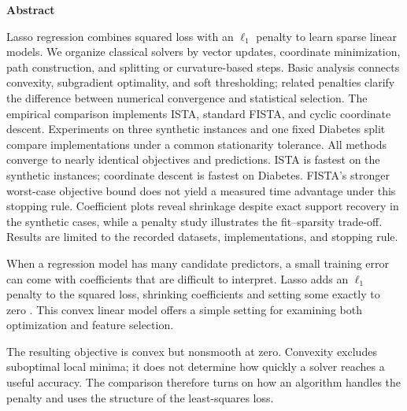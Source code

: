 \documentclass[10pt,letterpaper]{article}
\makeatletter
\renewcommand{\section}{\@startsection{section}{1}{\z@}{-2ex plus-.5ex minus-.2ex}{1.2ex plus.2ex}{\fontsize{12}{14}\selectfont\bfseries\raggedright}}
\makeatother
\begin{document}
\begingroup
\renewcommand{\thefootnote}{\ensuremath{*}}
\endgroup
\vspace{4pt}
\begin{center}\fontsize{12}{14}\selectfont\bfseries Abstract\end{center}
\begin{list}{}{\setlength{\leftmargin}{.5in}\setlength{\rightmargin}{.5in}}
\item[]
Lasso regression combines squared loss with an $\ell_1$ penalty to learn sparse linear models. We organize classical solvers by vector updates, coordinate minimization, path construction, and splitting or curvature-based steps. Basic analysis connects convexity, subgradient optimality, and soft thresholding; related penalties clarify the difference between numerical convergence and statistical selection. The empirical comparison implements ISTA, standard FISTA, and cyclic coordinate descent. Experiments on three synthetic instances and one fixed Diabetes split compare implementations under a common stationarity tolerance. All methods converge to nearly identical objectives and predictions. ISTA is fastest on the synthetic instances; coordinate descent is fastest on Diabetes. FISTA's stronger worst-case objective bound does not yield a measured time advantage under this stopping rule. Coefficient plots reveal shrinkage despite exact support recovery in the synthetic cases, while a penalty study illustrates the fit--sparsity trade-off. Results are limited to the recorded datasets, implementations, and stopping rule.
\end{list}
\vspace{3pt}
\section{Introduction}
When a regression model has many candidate predictors, a small training error can come with coefficients that are difficult to interpret. Lasso adds an $\ell_1$ penalty to the squared loss, shrinking coefficients and setting some exactly to zero \citep{tibshirani1996}. This convex linear model offers a simple setting for examining both optimization and feature selection.

The resulting objective is convex but nonsmooth at zero. Convexity excludes suboptimal local minima; it does not determine how quickly a solver reaches a useful accuracy. The comparison therefore turns on how an algorithm handles the penalty and uses the structure of the least-squares loss.
\end{document}
